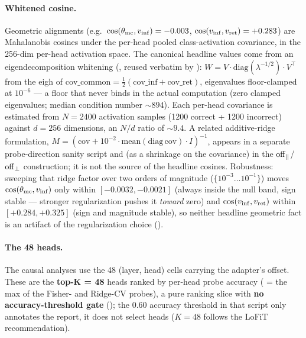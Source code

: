 \paragraph{Whitened cosine.}
Geometric alignments (e.g.\ $\cos(\theta_{\mathrm{mc}}, v_{\mathrm{inf}}) = -0.003$,
$\cos(v_{\mathrm{inf}}, v_{\mathrm{ret}}) = +0.283$) are Mahalanobis cosines under the per-head pooled
class-activation covariance, in the 256-dim per-head activation space. The canonical
headline values come from an eigendecomposition whitening
(, reused
verbatim by ):
$W = V\cdot\mathrm{diag}(\lambda^{-1/2})\cdot V^{\top}$ from the eigh of
$\mathrm{cov\_common} = \tfrac{1}{2}(\mathrm{cov\_inf} + \mathrm{cov\_ret})$,
eigenvalues floor-clamped at $10^{-6}$ --- a floor that never binds in the actual
computation (zero clamped eigenvalues; median condition number ${\sim}894$). Each
per-head covariance is estimated from $N = 2400$ activation samples (1200 correct +
1200 incorrect) against $d = 256$ dimensions, an $N/d$ ratio of ${\sim}9.4$. A
related additive-ridge formulation,
$M = (\mathrm{cov} + 10^{-2}\cdot\mathrm{mean}(\mathrm{diag\,cov})\cdot I)^{-1}$,
appears in a separate probe-direction sanity script and (as a shrinkage on the
covariance) in the $\mathrm{off}_{\parallel}$/$\mathrm{off}_{\perp}$ construction; it is not the source of the
headline cosines. Robustness: sweeping that ridge factor over two orders of
magnitude ($\{10^{-3} \ldots 10^{-1}\}$) moves $\cos(\theta_{\mathrm{mc}}, v_{\mathrm{inf}})$ only within
$[-0.0032, -0.0021]$ (always inside the null band, sign stable --- stronger
regularization pushes it \emph{toward} zero) and $\cos(v_{\mathrm{inf}}, v_{\mathrm{ret}})$ within
$[+0.284, +0.325]$ (sign and magnitude stable), so neither headline geometric fact
is an artifact of the regularization choice
().

\paragraph{The 48 heads.}
The causal analyses use the 48 (layer, head) cells carrying the adapter's offset.
These are the \textbf{top-K = 48} heads ranked by per-head probe accuracy
( = the max of the Fisher- and Ridge-CV probes), a pure ranking
slice with \textbf{no accuracy-threshold gate}
(); the 0.60 accuracy
threshold in that script only annotates the report, it does not select heads
($K = 48$ follows the LoFiT recommendation).

